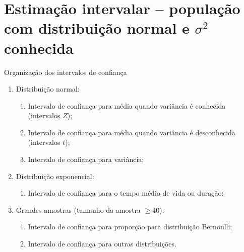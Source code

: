 \documentclass[8pt]{beamer}
\begin{document}
%  
% 
% 



\section{Estimação intervalar -- população com distribuição normal e $\sigma^2$ conhecida}

\begin{frame}{Organização dos intervalos de confiança}
	
\huge 
	\begin{enumerate}
		\item Distribuição normal:
		\begin{enumerate}
			\item Intervalo de confiança para média quando variância é conhecida (intervalos $Z$);
			\item Intervalo de confiança para média quando variância é desconhecida (intervalos $t$);
			\item Intervalo de confiança para variância;
		\end{enumerate}
		\vfill
		
		\item Distribuição exponencial:
		\begin{enumerate}
			\item Intervalo de confiança para o tempo médio de vida ou duração;
		\end{enumerate}
		\vfill
		
		\item Grandes amostras (tamanho da amostra $\geq 40$):
		\begin{enumerate}
			\item Intervalo de confiança para proporção para distribuição Bernoulli;
			\item Intervalo de confiança  para outras distribuições.
		\end{enumerate}
	\end{enumerate}

\normalsize
\end{frame}
\end{document}
